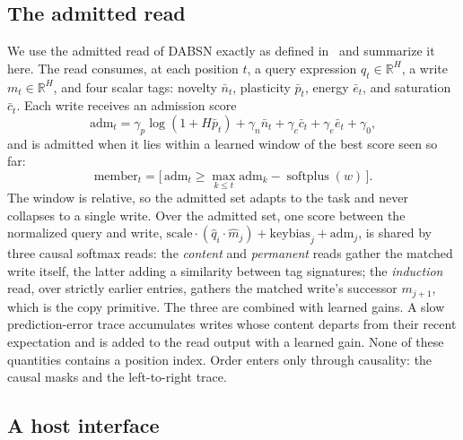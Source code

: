 \documentclass[11pt]{article}
\newcommand{\R}{\mathbb R}
\newcommand{\spplus}{\operatorname{softplus}}
\begin{document}
\subsection{The admitted read}

We use the admitted read of DABSN exactly as defined in~\citep{rosdahl2026dabsn}
and summarize it here. The read consumes, at each position $t$, a query expression
$q_t\in\R^H$, a write $m_t\in\R^H$, and four scalar tags: novelty $\bar n_t$,
plasticity $\bar p_t$, energy $\bar e_t$, and saturation $\bar c_t$. Each write
receives an admission score
\begin{equation}
\mathrm{adm}_t = \gamma_p\log(1+H\bar p_t) + \gamma_n\bar n_t + \gamma_c\bar c_t
 + \gamma_e\bar e_t + \gamma_0,
\end{equation}
and is admitted when it lies within a learned window of the best score seen so far:
\begin{equation}
\mathrm{member}_t = \Big[\,\mathrm{adm}_t \ge \max_{k\le t}\mathrm{adm}_k
 - \spplus(w)\,\Big].
\label{eq:admission}
\end{equation}
The window is relative, so the admitted set adapts to the task and never collapses
to a single write. Over the admitted set, one score between the normalized query
and write,
$\mathrm{scale}\cdot(\hat q_i\cdot\hat m_j)+\mathrm{keybias}_j+\mathrm{adm}_j$,
is shared by three causal softmax reads: the \emph{content} and \emph{permanent}
reads gather the matched write itself, the latter adding a similarity between tag
signatures; the \emph{induction} read, over strictly earlier entries, gathers the
matched write's successor $m_{j+1}$, which is the copy primitive. The three are
combined with learned gains. A slow prediction-error trace accumulates writes whose
content departs from their recent expectation and is added to the read output with
a learned gain. None of these quantities contains a position index. Order enters
only through causality: the causal masks and the left-to-right trace.

\subsection{A host interface}
\end{document}
